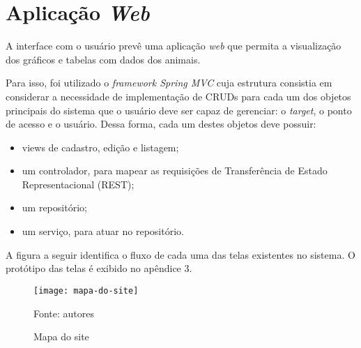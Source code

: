 \section{Aplicação \emph{Web}}

A interface com o usuário prevê uma aplicação \emph{web} que permita a visualização dos gráficos e tabelas com dados dos animais.

Para isso, foi utilizado o \emph{framework Spring MVC} cuja estrutura consistia em considerar a necessidade de implementação de CRUDs para cada um dos objetos principais do sistema que o usuário deve ser capaz de gerenciar: o \emph{target}, o ponto de acesso e o usuário. Dessa forma, cada um destes objetos deve possuir:

\begin{itemize}
	\item views de cadastro, edição e listagem;
	\item um controlador, para mapear as requisições de Transferência de Estado Representacional (REST);
	\item um repositório;
	\item um serviço, para atuar no repositório.
\end{itemize}

A figura a seguir identifica o fluxo de cada uma das telas existentes no sistema. O protótipo das telas é exibido no apêndice 3.

\begin{figure}[ht]
  \centering
    \caption{Mapa do site}
    \texttt{[image: mapa-do-site]}
  \centerline{\small{Fonte: autores}}
\end{figure}
\FloatBarrier
